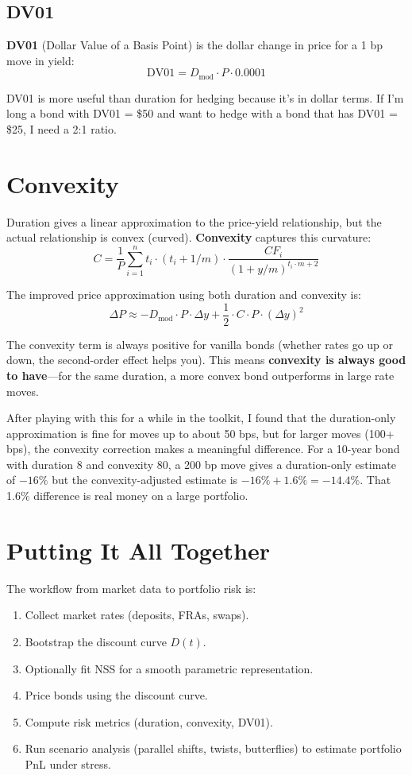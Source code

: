 \documentclass[11pt]{article}
\begin{document}
\subsection{DV01}

\textbf{DV01} (Dollar Value of a Basis Point) is the dollar change in price for a 1 bp move in yield:
\[
\text{DV01} = D_{\text{mod}} \cdot P \cdot 0.0001
\]

DV01 is more useful than duration for hedging because it's in dollar terms. If I'm long a bond with DV01 = \$50 and want to hedge with a bond that has DV01 = \$25, I need a 2:1 ratio.

\section{Convexity}

Duration gives a linear approximation to the price-yield relationship, but the actual relationship is convex (curved). \textbf{Convexity} captures this curvature:
\[
C = \frac{1}{P} \sum_{i=1}^{n} t_i \cdot (t_i + 1/m) \cdot \frac{CF_i}{(1 + y/m)^{t_i \cdot m + 2}}
\]

The improved price approximation using both duration and convexity is:
\[
\boxed{\Delta P \approx -D_{\text{mod}} \cdot P \cdot \Delta y + \frac{1}{2} \cdot C \cdot P \cdot (\Delta y)^2}
\]

The convexity term is always positive for vanilla bonds (whether rates go up or down, the second-order effect helps you). This means \textbf{convexity is always good to have}---for the same duration, a more convex bond outperforms in large rate moves.

After playing with this for a while in the toolkit, I found that the duration-only approximation is fine for moves up to about 50 bps, but for larger moves (100+ bps), the convexity correction makes a meaningful difference. For a 10-year bond with duration 8 and convexity 80, a 200 bp move gives a duration-only estimate of $-16\%$ but the convexity-adjusted estimate is $-16\% + 1.6\% = -14.4\%$. That 1.6\% difference is real money on a large portfolio.

\section{Putting It All Together}

The workflow from market data to portfolio risk is:
\begin{enumerate}
\item Collect market rates (deposits, FRAs, swaps).
\item Bootstrap the discount curve $D(t)$.
\item Optionally fit NSS for a smooth parametric representation.
\item Price bonds using the discount curve.
\item Compute risk metrics (duration, convexity, DV01).
\item Run scenario analysis (parallel shifts, twists, butterflies) to estimate portfolio PnL under stress.
\end{enumerate}
\end{document}
